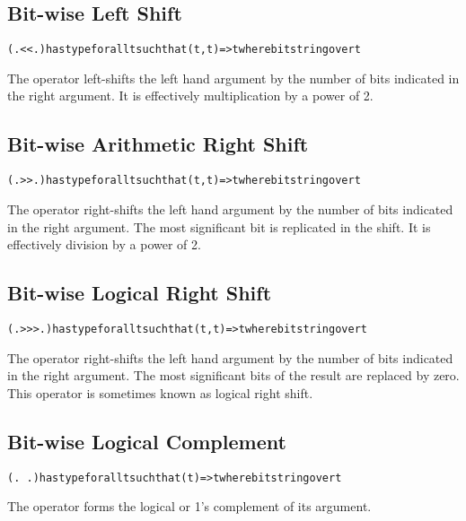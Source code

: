 \subsection{ Bit-wise Left Shift}
\label{bitLeft}
\begin{alltt}
(.<<.) has type for all t such that (t,t)=>t where bitstring over t
\end{alltt}

The  operator left-shifts the left hand argument by the number of bits indicated in the right argument. It is effectively multiplication by a power of 2.

\subsection{ Bit-wise Arithmetic Right Shift}
\label{bitRight}
\begin{alltt}
(.>>.) has type for all t such that (t,t)=>t where bitstring over t
\end{alltt}

The  operator right-shifts the left hand argument by the number of bits indicated in the right argument. The most significant bit is replicated in the shift. It is effectively division by a power of 2.

\subsection{ Bit-wise Logical Right Shift}
\label{bitRightLogic}
\begin{alltt}
(.>>>.) has type for all t such that (t,t)=>t where bitstring over t
\end{alltt}

The  operator right-shifts the left hand argument by the number of bits indicated in the right argument. The most significant bits of the result are replaced by zero. This operator is sometimes known as logical right shift.

\subsection{\q{.\~\xspace.} Bit-wise Logical Complement}
\label{bitComplement}
\begin{alltt}
(.~.) has type for all t such that (t)=>t where bitstring over t
\end{alltt}

The  operator forms the logical or 1's complement of its argument.

